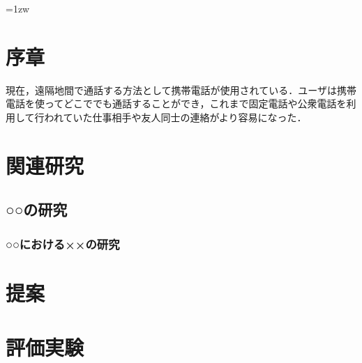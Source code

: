 \documentclass[a4paper, dvipdfmx]{jreport}	%
\subtitle{—図書館情報メディア研究科の場合—}{: A Case Study at the Graduate School of Library, Information, and Media Studies}
\begin{document}
\makecover

\addtolength{\textheight}{-5mm}	%
\setlength{\footskip}{15mm}	%
\fontsize{11pt}{15pt}\selectfont

\pagebreak\setcounter{page}{1}
\pagestyle{plain}
\tableofcontents
\listoffigures

\parindent=1zw	%
\pagebreak\setcounter{page}{1}
\pagestyle{plain}


\chapter{序章}
現在，遠隔地間で通話する方法として携帯電話が使用されている．ユーザは携帯電話を使ってどこででも通話することができ，これまで固定電話や公衆電話を利用して行われていた仕事相手や友人同士の連絡がより容易になった．\cite{甘利俊一1989神経回路網の数理}

\chapter{関連研究}
\section{○○の研究}
\subsection{○○における××の研究}

\chapter{提案}

\chapter{評価実験}
\end{document}
